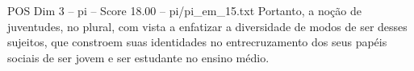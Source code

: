 \begin{textsample}{POS Dim 3 – pi – Score 18.00 – pi/pi\_em\_15.txt}
Portanto, a noção de juventudes, no plural, com vista a enfatizar a diversidade de modos de ser desses sujeitos, que constroem suas identidades no entrecruzamento dos seus papéis sociais de ser jovem e ser estudante no ensino médio.

\end{textsample}
